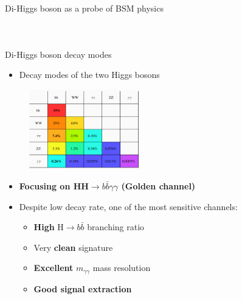 \begin{frame}{Di-Higgs boson as a probe of BSM physics}
\begin{columns}
\begin{figure}
    \centering
\end{figure}

\end{columns}
\end{frame}

\begin{frame}{Di-Higgs boson decay modes}

\begin{itemize}
    \item Decay modes of the two Higgs bosons
\end{itemize}
\begin{figure}
    \centering
    \includegraphics[width=0.43\textwidth]{Part1/Img/HH_decays2.png}
\end{figure}
\pause
\begin{itemize}
    \item \textbf{\textcolor{HHred}{Focusing on HH$\to b\bar{b}\gamma\gamma$} (Golden channel)}
    \item Despite low decay rate, one of the most sensitive channels:
    \begin{itemize}
        \item \textbf{High} H$\to b\bar{b}$ branching ratio
        \item Very \textbf{clean} signature
        \item \textbf{Excellent} $m_{\gamma\gamma}$ mass resolution
        \item \textbf{Good signal extraction}
    \end{itemize}
\end{itemize}

\end{frame}